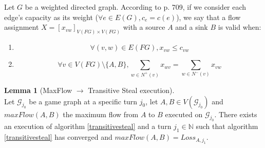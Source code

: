\documentclass[11pt]{article}
\theoremstyle{definition}
\theoremstyle{corollary}
\theoremstyle{lemma}
\newtheorem{lemma}{Lemma}[section]
\begin{document}
    Let $G$ be a weighted directed graph. According to \cite{clrs} p. 709, if we consider each edge's capacity as its weight
    ($\forall e \in E(G), c_e = c(e)$), we say that a flow assignment $X = [x_{vw}]_{V(FG) \times V(FG)}$ with a source $A$
    and a sink $B$ is valid when:
    \begin{enumerate}
       \item \begin{equation}
             \label{flow1}
                \forall (v, w) \in E(FG), x_{vw} \leq c_{vw}
             \end{equation}
       \item \begin{equation}
             \label{flow2}
                \forall v \in V(FG) \setminus \{A,B\},
                \sum\limits_{w \in N^{+}(v)}x_{wv} = \sum\limits_{w \in N^{-}(v)}x_{vw}
             \end{equation}
    \end{enumerate}
    \begin{lemma}[MaxFlow $\rightarrow$ Transitive Steal execution] \ \\
       \label{maxflowgame}
       Let $\mathcal{G}_{j_0}$ be a game graph at a specific turn $j_0$, let $A, B \in V(\mathcal{G}_{j_0})$ and
       $maxFlow(A, B)$ the maximum flow from $A$ to $B$ executed on $\mathcal{G}_{j_0}$. There exists an execution of
       algorithm \ref{transitivesteal} and a turn $j_1 \in \mathbb{N}$ such that algorithm \ref{transitivesteal} has
       converged and $maxFlow(A, B) = Loss_{A, j_1}$.
    \end{lemma}
\end{document}
